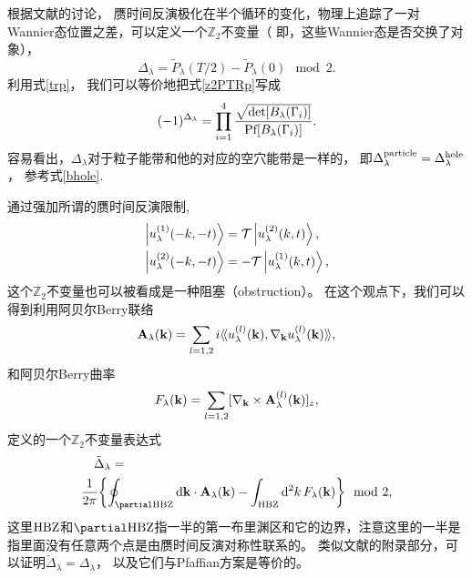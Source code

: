 根据文献\cite{Fu2006}的讨论，
赝时间反演极化在半个循环的变化，物理上追踪了一对Wannier态位置之差，可以定义一个$\mathbb Z_2$不变量（
即，这些Wannier态是否交换了对象），
\begin{equation}
	\Delta_\lambda =\tilde P_\lambda (T/2)-\tilde P_\lambda (0)\mod 2.\label{z2PTRp}
\end{equation}
利用式\eqref{trp}，
我们可以等价地把式\eqref{z2PTRp}写成
\begin{equation}\label{z2dl}
	(-1)^{\Delta_\lambda }=\prod_{i=1}^4\frac{\sqrt{\det[B_\lambda (\Gamma_i)]}}{\textnormal{Pf}[B_\lambda (\Gamma_i)]}.
\end{equation}
容易看出，$\Delta_\lambda $对于粒子能带和他的对应的空穴能带是一样的，
即$\Delta_\lambda ^{\textnormal{particle}}=\Delta_\lambda ^{\textnormal{hole}}$，
参考式\eqref{bhole}.

通过强加所谓的赝时间反演限制\cite{Fu2006},
\begin{equation*}
	\begin{split}
		\ket{u^{(1)}_\lambda (-k,-t)} &=\mathcal T\ket{u^{(2)}_\lambda (k,t)},\\
		\ket{u^{(2)}_\lambda (-k,-t)} &=-\mathcal T\ket{u^{(1)}_\lambda (k,t)},
	\end{split}
\end{equation*}
这个$\mathbb Z_2$不变量也可以被看成是一种阻塞（obstruction）。
在这个观点下，我们可以得到利用阿贝尔Berry联络
\begin{equation}\label{berryconnection}
	\vb A_\lambda (\vb k)= \sum_{l=1,2} i\langle\!\langle u_\lambda ^{(l)}(\vb k),\nabla_{\vb k} u_\lambda ^{(l)}(\vb k) \rangle\!\rangle,
\end{equation}
和阿贝尔Berry曲率
\begin{equation}
	F_{\lambda }(\vb k) =\sum_{l=1,2} [\nabla_{\vb k}\times \vb A_{\lambda }^{(l)}(\vb k)]_z,\nonumber
\end{equation}
定义的一个$\mathbb Z_2$不变量表达式 \cite{Kondo2019}
\begin{equation}\label{fukui}
	\begin{split}
		&\quad \tilde \Delta_\lambda =\\
	& \frac{1}{2\pi}\Bqty{\oint_{\partial \textnormal{HBZ}}\dd{\vb k}\cdot\vb A_\lambda (\vb k)-\int_{\textnormal{HBZ}}\dd[2]{k}F_\lambda (\vb k)}\mod 2,
	\end{split}
\end{equation}
这里$\textnormal{HBZ}$和$\partial\textnormal{HBZ}$指一半的第一布里渊区和它的边界，注意这里的一半是指里面没有任意两个点是由赝时间反演对称性联系的。
类似文献\cite{Fu2006}的附录部分，可以证明$\tilde \Delta_\lambda =\Delta_\lambda $，
以及它们与Pfaffian方案是等价的。

